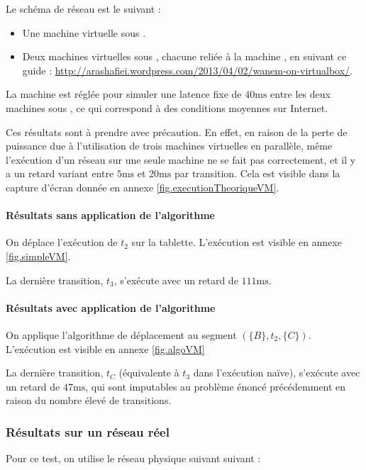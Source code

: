 Le schéma de réseau est le suivant : 
\begin{itemize}
	\item Une machine virtuelle sous .
	\item Deux machines virtuelles sous , chacune reliée à la machine , en suivant ce guide : \url{http://arashafiei.wordpress.com/2013/04/02/wanem-on-virtualbox/}.
\end{itemize}

La machine  est réglée pour simuler une latence fixe de $\num{40}\si{\milli\second}$ entre les deux machines sous , ce qui correspond à des conditions moyennes sur Internet. 

Ces résultats sont à prendre avec précaution. En effet, en raison de la perte de puissance due à l'utilisation de trois machines virtuelles en parallèle, même l'exécution d'un réseau sur une seule machine ne se fait pas correctement, et il y a un retard variant entre $\num{5}\si{\milli\second}$ et $\num{20}\si{\milli\second}$ par transition.	Cela est visible dans la capture d'écran donnée en annexe \ref{fig.executionTheoriqueVM}.

\paragraph{Résultats sans application de l'algorithme}
On déplace l'exécution de $t_2$ sur la tablette.
L'exécution est visible en annexe \ref{fig.simpleVM}.

La dernière transition, $t_3$, s'exécute avec un retard de $\num{111} \si{\milli\second}$.

\paragraph{Résultats avec application de l'algorithme}
On applique l'algorithme de déplacement au segment $(\lbrace B \rbrace, t_2, \lbrace C \rbrace)$. L'exécution est visible en annexe \ref{fig.algoVM}

La dernière transition, $t_C$ (équivalente à $t_3$ dans l'exécution naïve), s'exécute avec un retard de $\num{47} \si{\milli\second}$, qui sont imputables au problème énoncé précédemment en raison du nombre élevé de transitions.

\subsubsection{Résultats sur un réseau réel}
Pour ce test, on utilise le réseau physique suivant suivant : 

